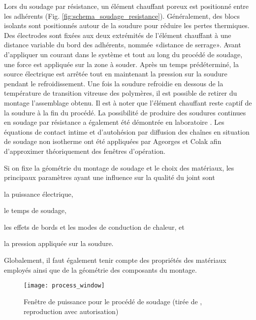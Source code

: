 Lors du soudage par résistance, un élément chauffant poreux est positionné entre les adhérents (Fig. \ref{fig:schema_soudage_resistance}). 
Généralement, des blocs isolants sont positionnés autour de la soudure pour réduire les pertes thermiques. 
Des électrodes sont fixées aux deux extrémités de l'élément chauffant à une distance variable du bord des adhérents, nommée «distance de serrage». 
Avant d'appliquer un courant dans le système et tout au long du procédé de soudage, une force est appliquée sur la zone à souder. 
Après un temps prédéterminé, la source électrique est arrêtée tout en maintenant la pression sur la soudure pendant le refroidissement. 
Une fois la soudure refroidie en dessous de la température de transition vitreuse des polymères, il est possible de retirer du montage l'assemblage obtenu. 
Il est à noter que l'élément chauffant reste captif de la soudure à la fin du procédé. 
La possibilité de produire des soudures continues en soudage par résistance a également été démontrée en laboratoire \cite{Shi2015a}. 
Les équations de contact intime et d'autohésion par diffusion des chaînes en situation de soudage non isotherme ont été appliquées par Ageorges \cite{Ageorges1998} et Colak \cite{Colak2002} afin d'approximer théoriquement des fenêtres d'opération. 

Si on fixe la géométrie du montage de soudage et le choix des matériaux, les principaux paramètres ayant une influence sur la qualité du joint sont 
\begin{inparaenum}[(1)]
	\item la puissance électrique, 
	\item le temps de soudage, 
	\item les effets de bords et les modes de conduction de chaleur, et
	\item la pression appliquée sur la soudure. 
\end{inparaenum}
Globalement, il faut également tenir compte des propriétés des matériaux employés ainsi que de la géométrie des composants du montage. 

\begin{figure}[h]
	\centering
	\texttt{[image: process\_window]}
	\caption{Fenêtre de puissance pour le procédé de soudage (tirée de \cite{Stavrov2005a}, reproduction avec autorisation)}
	\label{fig:process_window}
\end{figure}

